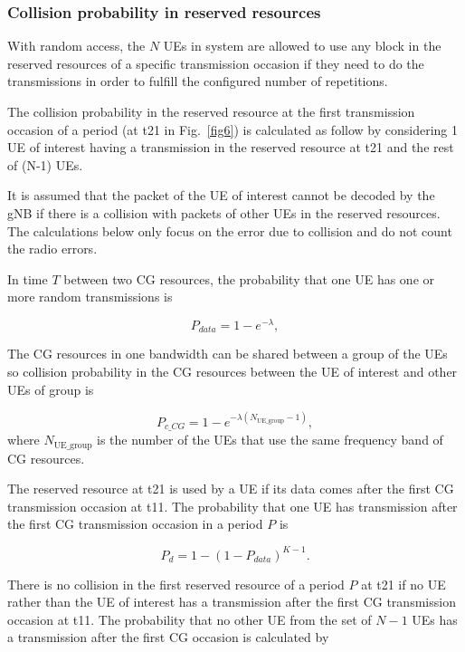 \documentclass{ieeeaccess}
\begin{document}
\subsubsection{Collision probability in reserved resources}\label{IIIB3}

With random access, the $N$ UEs in system are allowed to use any block in the reserved resources of a specific transmission occasion if they need to do the transmissions in order to fulfill the configured number of repetitions.

The collision probability in the reserved resource at the first transmission occasion of a period (at t21 in Fig.~\ref{fig6}) is calculated as follow by considering 1 UE of interest having a transmission in the reserved resource at t21 and the rest of (N-1) UEs.

It is assumed that the packet of the UE of interest cannot be decoded by the gNB if there is a collision with packets of other UEs in the reserved resources. The calculations below only focus on the error due to collision and do not count the radio errors.

In time $T$ between two CG resources, the probability that one UE has one or more random transmissions is

\begin{equation}
P_{data} = 1 - e^{-\lambda},\label{eq1}
\end{equation}

The CG resources in one bandwidth can be shared between a group of the UEs so collision probability in the CG resources between the UE of interest and other UEs of group is 

\begin{equation}
P_{c\_CG} = 1 - e^{-\lambda(N_\mathrm{UE\_group}-1)},\label{eq2}
\end{equation}
where $N_\mathrm{UE\_group}$ is the number of the UEs that use the same frequency band of CG resources.

The reserved resource at t21 is used by a UE if its data comes after the first CG transmission occasion at t11. The probability that one UE has transmission after the first CG transmission occasion in a period $P$ is 

\begin{equation}
P_{d} = 1 - (1-P_{data})^{K-1}.\label{eq3}
\end{equation}

There is no collision in the first reserved resource of a period $P$ at t21 if no UE rather than the UE of interest has a transmission after the first CG transmission occasion at t11. The probability that no other UE from the set of $N-1$ UEs has a transmission after the first CG occasion is calculated by 
\end{document}
